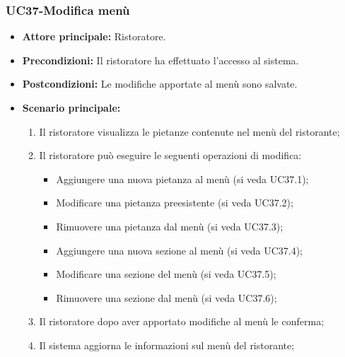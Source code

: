 \subsubsection{UC37-Modifica menù}
\begin{itemize}
    \item \textbf{Attore principale:} Ristoratore.
    \item \textbf{Precondizioni:} Il ristoratore ha effettuato l'accesso al sistema.
    \item \textbf{Postcondizioni:} Le modifiche apportate al menù sono salvate.
    \item \textbf{Scenario principale:}
    \begin{enumerate}
        \item Il ristoratore visualizza le pietanze contenute nel menù del ristorante;
        \item Il ristoratore può eseguire le seguenti operazioni di modifica:
        \begin{itemize}
           \item Aggiungere una nuova pietanza al menù (si veda UC37.1);
           \item Modificare una pietanza preesistente (si veda UC37.2);
           \item Rimuovere una pietanza dal menù (si veda UC37.3);
           \item Aggiungere una nuova sezione al menù (si veda UC37.4);
           \item Modificare una sezione del menù (si veda UC37.5);
           \item Rimuovere una sezione dal menù (si veda UC37.6);
        \end{itemize}
        \item Il ristoratore dopo aver apportato modifiche al menù le conferma;
        \item Il sistema aggiorna le informazioni sul menù del ristorante;
    \end{enumerate}
\end{itemize}

